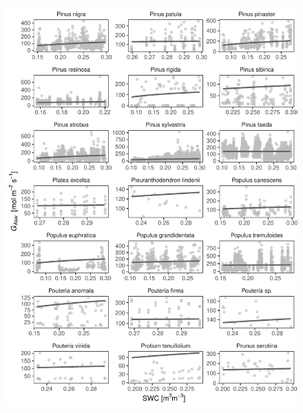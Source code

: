 \documentclass[11pt,twoside]{reedthesis}
\begin{document}
\begin{figure}[H]

{\centering \includegraphics[width=1\linewidth]{figure/appendixD/ggg13} 

}

\end{figure}
\end{document}
